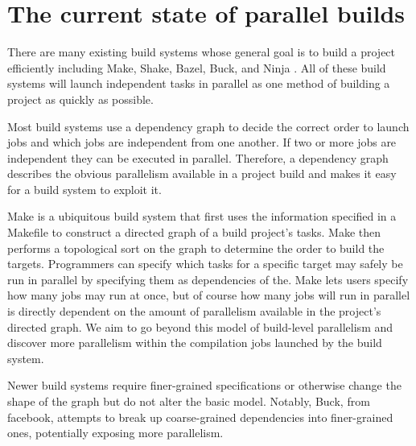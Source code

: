 \documentclass[10pt]{article}
\begin{document}
\section{The current state of parallel builds}
\label{sec:state}


There are many existing build systems whose general goal is to build a project efficiently
including Make, Shake, Bazel, Buck, and Ninja \cite{feldman1979make, mitchell2012shake, bazel, buck, ninja}.
All of these build systems will launch independent tasks in parallel as one method of building a
project as quickly as possible.

Most build systems use a dependency graph to decide the correct  order to launch jobs and which jobs are
independent from one another.  If two or more jobs are independent they can be executed
in parallel.  Therefore, a dependency graph describes the obvious parallelism available in a project build
and makes it easy for a build system to exploit it.

Make is a ubiquitous build system that first uses the information specified  in a
Makefile to construct a directed graph of a build project's tasks.  Make then performs a
topological sort on the graph to determine the order to build the targets.  Programmers can
specify which tasks
for a specific target may safely be run in parallel by specifying them as dependencies of the.
Make lets users specify how many
jobs may run at once, but of course how many jobs will run in parallel is directly dependent on the amount
of parallelism available in the project's directed graph.   We aim to go
beyond this model of build-level parallelism and discover more parallelism within the compilation jobs
launched by the build system.

Newer build systems require finer-grained specifications or otherwise change the shape of the graph but
do not alter the basic model. Notably, Buck, from facebook, attempts to break up coarse-grained
dependencies into finer-grained ones, potentially exposing more parallelism.

\end{document}
